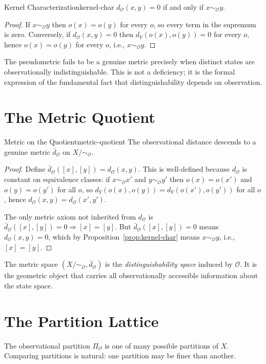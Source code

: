 \documentclass[12pt,twoside,openright]{book}
\newcommand{\obs}{\mathcal{O}}
\newcommand{\distMetric}{d_{\mathcal{O}}}
\providecommand{\partitionObs}{\Pi_{\obs}}
\providecommand{\quotientObs}{X/{\sim_{\obs}}}
\begin{document}
\begin{proposition}{Kernel Characterization}{kernel-char}
$\distMetric(x,y)=0$ if and only if $x\sim_\obs y$.
\begin{proof}
If $x\sim_\obs y$ then $o(x)=o(y)$ for every $o$, so every
term in the supremum is zero. Conversely, if
$\distMetric(x,y)=0$ then $d_Y(o(x),o(y))=0$ for every $o$,
hence $o(x)=o(y)$ for every $o$, i.e., $x\sim_\obs y$.
\end{proof}
\end{proposition}

The pseudometric fails to be a genuine metric precisely when
distinct states are observationally indistinguishable. This is
not a deficiency; it is the formal expression of the fundamental
fact that distinguishability depends on observation.

\section{The Metric Quotient}

\begin{theorem}{Metric on the Quotient}{metric-quotient}
The observational distance descends to a genuine metric
$\bar{d}_\obs$ on $\quotientObs$.
\begin{proof}
Define $\bar{d}_\obs([x],[y])=\distMetric(x,y)$. This is
well-defined because $\distMetric$ is constant on equivalence
classes: if $x\sim_\obs x'$ and $y\sim_\obs y'$ then
$o(x)=o(x')$ and $o(y)=o(y')$ for all $o$, so
$d_Y(o(x),o(y))=d_Y(o(x'),o(y'))$ for all $o$, hence
$\distMetric(x,y)=\distMetric(x',y')$.

The only metric axiom not inherited from $\distMetric$ is
$\bar{d}_\obs([x],[y])=0\Rightarrow [x]=[y]$. But
$\bar{d}_\obs([x],[y])=0$ means $\distMetric(x,y)=0$, which
by Proposition~\ref{prop:kernel-char} means $x\sim_\obs y$,
i.e., $[x]=[y]$.
\end{proof}
\end{theorem}

The metric space $(\quotientObs,\bar{d}_\obs)$ is the
\emph{distinguishability space} induced by $\obs$. It is the
geometric object that carries all observationally accessible
information about the state space.

\section{The Partition Lattice}

The observational partition $\partitionObs$ is one of many
possible partitions of $X$. Comparing partitions is natural:
one partition may be finer than another.
\end{document}
